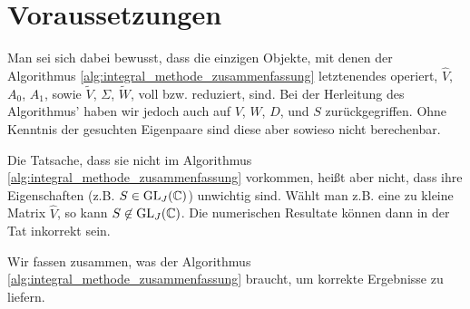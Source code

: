 \section{Voraussetzungen}

Man sei sich dabei bewusst, dass die einzigen Objekte, mit denen der Algorithmus \ref{alg:integral_methode_zusammenfassung} letztenendes operiert, $\hat V$, $A_0$, $A_1$, sowie $\tilde V$, $\Sigma$, $\tilde W$, voll bzw. reduziert, sind.
Bei der Herleitung des Algorithmus' haben wir jedoch auch auf $V$, $W$, $D$, und $S$ zurückgegriffen.
Ohne Kenntnis der gesuchten Eigenpaare sind diese aber sowieso nicht berechenbar.

Die Tatsache, dass sie nicht im Algorithmus \ref{alg:integral_methode_zusammenfassung} vorkommen, heißt aber nicht, dass ihre Eigenschaften (z.B. $S \in \operatorname{GL}_J(\mathbb{C})$) unwichtig sind.
Wählt man z.B. eine zu kleine Matrix $\hat V$, so kann $S \not \in \operatorname{GL}_J(\mathbb{C})$.
Die numerischen Resultate können dann in der Tat inkorrekt sein.

Wir fassen zusammen, was der Algorithmus \ref{alg:integral_methode_zusammenfassung} braucht, um korrekte Ergebnisse zu liefern.

